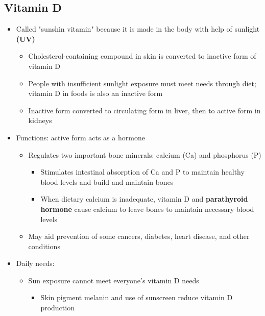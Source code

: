 \documentclass[12pt]{article}
\begin{document}
        \subsection{Vitamin D}
            \begin{itemize}
                \item Called "sunshin vitamin" because it is made in the body with help of sunlight \textbf{(UV)}
                    \begin{itemize}
                        \item Cholesterol-containing compound in skin is converted to inactive form of vitamin D
                        \item People with insufficient sunlight exposure must meet needs through diet; vitamin D in foods is also an inactive form
                        \item Inactive form converted to circulating form in liver, then to active form in kidneys
                    \end{itemize}
                \item Functions: active form acts as a hormone
                    \begin{itemize}
                        \item Regulates two important bone minerals: calcium (Ca) and phosphorus (P)
                            \begin{itemize}
                                \item Stimulates intestinal absorption of Ca and P to maintain healthy blood levels and build and maintain bones
                                \item When dietary calcium is inadequate, vitamin D and \textbf{parathyroid hormone} cause calcium to leave bones to maintain necessary blood levels
                            \end{itemize}
                        \item May aid prevention of some cancers, diabetes, heart disease, and other conditions
                    \end{itemize}
                \item Daily needs:
                    \begin{itemize}
                        \item Sun exposure cannot meet everyone's vitamin D needs
                            \begin{itemize}
                                \item Skin pigment melanin and use of sunscreen reduce vitamin D production

\end{itemize}
\end{itemize}
\end{itemize}
\end{document}
